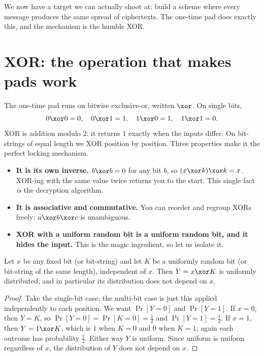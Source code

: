 We now have a target we can actually shoot at: build a scheme where every message produces the same spread of ciphertexts. The one-time pad does exactly this, and the mechanism is the humble XOR.

\section{XOR: the operation that makes pads work}
\label{ch09:xor}

The one-time pad runs on bitwise exclusive-or, written $\xor$. On single bits,
\[
  0 \xor 0 = 0,\quad 0 \xor 1 = 1,\quad 1 \xor 0 = 1,\quad 1 \xor 1 = 0.
\]
XOR is addition modulo $2$: it returns $1$ exactly when the inputs differ. On bit-strings of equal length we XOR position by position. Three properties make it the perfect locking mechanism.

\begin{itemize}
  \item \textbf{It is its own inverse.} $b \xor b = 0$ for any bit $b$, so $(x \xor k) \xor k = x$. XOR-ing with the same value twice returns you to the start. This single fact \emph{is} the decryption algorithm.
  \item \textbf{It is associative and commutative.} You can reorder and regroup XORs freely: $a \xor b \xor c$ is unambiguous.
  \item \textbf{XOR with a uniform random bit is a uniform random bit, and it hides the input.} This is the magic ingredient, so let us isolate it.
\end{itemize}

\begin{lemma}
\label{ch09:masking}
Let $x$ be any fixed bit (or bit-string) and let $K$ be a uniformly random bit (or bit-string of the same length), independent of $x$. Then $Y = x \xor K$ is uniformly distributed, and in particular its distribution does not depend on $x$.
\end{lemma}

\begin{proof}
Take the single-bit case; the multi-bit case is just this applied independently to each position. We want $\Pr[Y = 0]$ and $\Pr[Y = 1]$. If $x = 0$, then $Y = K$, so $\Pr[Y=0] = \Pr[K=0] = \tfrac12$ and $\Pr[Y=1] = \tfrac12$. If $x = 1$, then $Y = 1 \xor K$, which is $1$ when $K=0$ and $0$ when $K=1$; again each outcome has probability $\tfrac12$. Either way $Y$ is uniform. Since uniform is uniform regardless of $x$, the distribution of $Y$ does not depend on $x$.
\end{proof}

